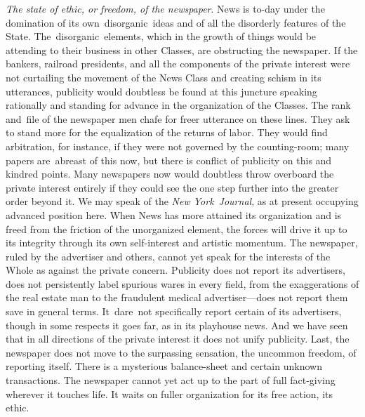 \documentclass[openany,nobib]{tufte-book}
\begin{document}
\emph{The state of ethic, or freedom, of the newspaper}. News is to-day
under the domination of its own~disorganic~ideas and of all the
disorderly features of the State. The~disorganic~elements, which in the
growth of things would be attending to their business in other Classes,
are obstructing the newspaper. If the bankers, railroad presidents, and
all the components of the private interest were not curtailing the
movement of the News Class and creating schism in its utterances,
publicity would doubtless be found at this juncture speaking rationally
and standing for advance in the organization of the Classes. The rank
and~file of the newspaper men chafe for freer utterance on these lines.
They ask to stand more for the equalization of the returns of labor.
They would find arbitration, for instance, if they were not governed by
the counting-room; many papers are~abreast of this now, but there is
conflict of publicity on this and kindred points. Many newspapers now
would doubtless throw overboard the private interest entirely if they
could see the one step further into the greater order beyond it. We may
speak of the \emph{New York}~\emph{Journal}, as at present occupying
advanced position here. When News has more attained its organization and
is freed from the friction of the unorganized element, the forces will
drive it up to its integrity through its own self-interest and artistic
momentum. The newspaper, ruled by the advertiser and others, cannot yet
speak for the interests of the Whole as against the private concern.
Publicity does not report its advertisers, does not persistently label
spurious wares in every field, from the exaggerations of the real estate
man to the fraudulent medical advertiser---does not report them save in
general terms. It~dare~not specifically report certain of its
advertisers, though in some respects it goes far, as in its playhouse
news. And we have seen that in all directions of the private interest it
does not unify publicity. Last, the newspaper does not move to the
surpassing sensation, the uncommon freedom, of reporting itself. There
is a mysterious balance-sheet and certain unknown transactions. The
newspaper cannot yet act up to the part of full fact-giving wherever it
touches life. It waits on fuller organization for its free action, its
ethic.~
\end{document}
